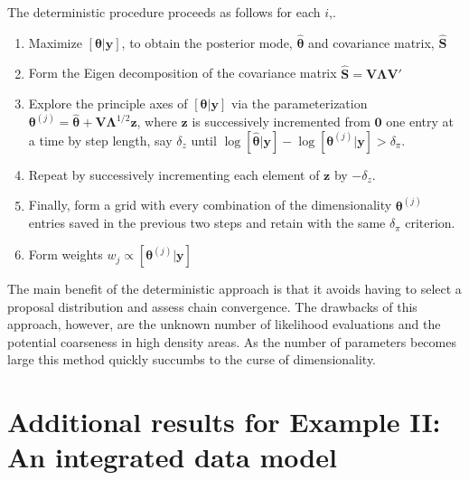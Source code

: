 \documentclass[12pt]{article}
\newcommand{\by}{\mathbf{y}}
\newcommand{\bt}{\boldsymbol{\theta}}
\newcommand{\bS}{\mathbf{S}}
\begin{document}
The deterministic procedure proceeds as follows for each $i$,.
\begin{enumerate}
\item Maximize $[\bt|\by]$, to obtain the posterior mode, $\hat{\bt}$ and covariance matrix, $\hat{\bS}$
\item Form the Eigen decomposition of the covariance matrix $\hat{\bS} = \mathbf{V}\boldsymbol{\Lambda}\mathbf{V}'$
\item Explore the principle axes of $[\bt|\by]$ via the parameterization $\bt^{(j)} = \hat{\bt} + \mathbf{V}\boldsymbol{\Lambda}^{1/2}\mathbf{z}$, where $\mathbf{z}$ is successively incremented from $\mathbf{0}$ one entry at a time by step length, say $\delta_z$ until $\log[\hat{\bt}|\by]-\log[\bt^{(j)}|\by] > \delta_\pi$.
\item Repeat by successively incrementing each element of $\mathbf{z}$ by $-\delta_z$.
\item Finally, form a grid with every combination of the dimensionality $\bt^{(j)}$ entries saved in the previous two steps and retain with the same $\delta_\pi$ criterion.
\item Form weights $w_j \propto [\bt^{(j)}|\by]$
\end{enumerate}
The main benefit of the deterministic approach is that it avoids having to select a proposal distribution and assess chain convergence. The drawbacks of this approach, however, are the unknown number of likelihood evaluations and the potential coarseness in high density areas. As the number of parameters becomes large this method quickly succumbs to the curse of dimensionality.
\clearpage 

\section{Additional results for Example II: An integrated data model}
\label{sec:ipm.results}
\end{document}
